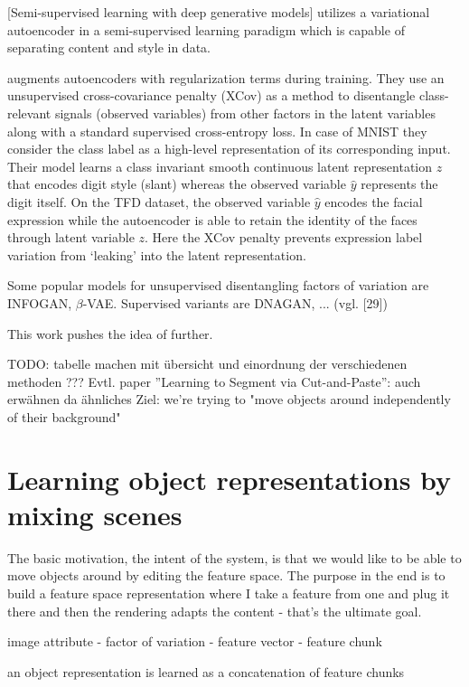 \documentclass[12pt,a4paper]{article}
\begin{document}
[Semi-supervised learning with deep generative models] utilizes a variational autoencoder in a semi-supervised learning paradigm which is capable of separating content and style in data.

\par\cite{1412.6583} augments autoencoders with regularization terms during training. They use an unsupervised cross-covariance penalty (XCov) as a method to disentangle class-relevant signals (observed variables) from other factors in the latent variables along with a standard supervised cross-entropy loss. In case of MNIST they consider the class label as a high-level representation of its corresponding input. Their model learns a class invariant smooth continuous latent representation $z$ that encodes digit style (slant) whereas the observed variable $\hat{y}$ represents the digit itself. On the TFD dataset, the observed variable $\hat{y}$ encodes the facial expression while the autoencoder is able to retain the identity of the faces through latent variable $z$. Here the XCov penalty prevents expression label variation from ‘leaking’ into the latent representation.

\par Some popular models for unsupervised disentangling factors of variation are INFOGAN, $\beta$-VAE. Supervised variants are DNAGAN, ... (vgl. [29]) 

\par This work pushes the idea of \cite{1711.07410} further.

TODO: tabelle machen mit übersicht und einordnung der verschiedenen methoden ???
Evtl. paper ”Learning to Segment via Cut-and-Paste”: auch erwähnen da ähnliches Ziel: we're trying to "move objects around independently of their background"

\section{Learning object representations by mixing scenes}
The basic motivation, the intent of the system, is that we would like to be able to move objects around by editing the feature space. The purpose in the end is to build a feature space representation where I take a feature from one and plug it there and then the rendering adapts the content - that's the ultimate goal.
\par image attribute - factor of variation - feature vector - feature chunk
\par an object representation is learned as a concatenation of feature chunks
\end{document}
